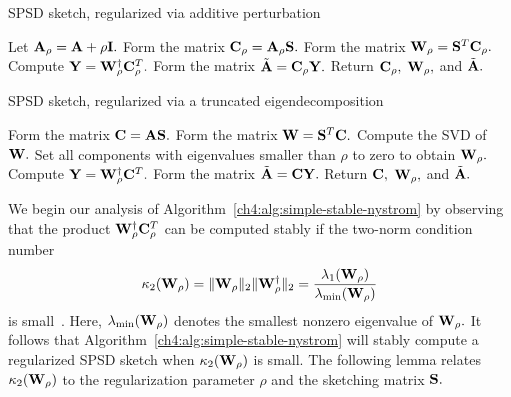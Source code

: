 \begin{algorithm}[t]
 \caption{SPSD sketch, regularized via additive perturbation~\cite{WS01}}
 \label{ch4:alg:simple-stable-nystrom}
 \algrenewcommand{}
 \algrenewcommand{}
 \begin{algorithmic}[1]
  \Statex
  
 \State Let $\mathbf{A}_\rho = \mathbf{A} + \rho \mathbf{I}.$
 \State Form the matrix $\mathbf{C}_\rho = \mathbf{A}_\rho \mathbf{S}.$
 \State Form the matrix $\mathbf{W}_\rho = \mathbf{S}^T \mathbf{C}_\rho.$
 \State Compute $\mathbf{Y} = \mathbf{W}_\rho^\dagger \mathbf{C}_\rho ^T.$
 \State Form the matrix $\tilde{\mathbf{A}} = \mathbf{C}_\rho \mathbf{Y}.$
 \State Return $\mathbf{C}_\rho,$ $\mathbf{W}_\rho,$ and $\tilde{\mathbf{A}}.$
  \end{algorithmic}
\end{algorithm}

\begin{algorithm}
 \caption{SPSD sketch, regularized via a truncated eigendecomposition~\cite[Algorithm 1]{CD11}}
 \label{ch4:alg:CD11}
 \algrenewcommand{}
 \algrenewcommand{}
 \begin{algorithmic}[1]
  \Statex

 \State Form the matrix $\mathbf{C} = \mathbf{A} \mathbf{S}.$
 \State Form the matrix $\mathbf{W} = \mathbf{S}^T \mathbf{C}.$
 \State Compute the SVD of $\mathbf{W}.$ Set all components with eigenvalues smaller than $\rho$ to zero to obtain
 $\mathbf{W}_\rho.$
 \State Compute $\mathbf{Y} = \mathbf{W}_\rho^\dagger \mathbf{C}^T.$
 \State Form the matrix $\tilde{\mathbf{A}} = \mathbf{C} \mathbf{Y}.$
 \State Return $\mathbf{C},$ $\mathbf{W}_\rho,$ and $\tilde{\mathbf{A}}.$
 \end{algorithmic}
\end{algorithm}

We begin our analysis of Algorithm~\ref{ch4:alg:simple-stable-nystrom} by observing that 
the product $\mathbf{W}_\rho^\dagger \mathbf{C}_\rho^T$ can be
computed stably if the two-norm condition number 
\[
 \kappa_2(\mathbf{W}_\rho) = \|\mathbf{W}_\rho\|_2 \|\mathbf{W}_\rho^\dagger\|_2 = \frac{\lambda_1(\mathbf{W}_\rho)}{\lambda_\text{min}(\mathbf{W}_\rho)}
\]
is small~\cite{GL96}. Here, $\lambda_\text{min}(\mathbf{W}_\rho)$ denotes the smallest nonzero eigenvalue of $\mathbf{W}_\rho.$ 
It follows that Algorithm~\ref{ch4:alg:simple-stable-nystrom}
will stably compute a regularized SPSD sketch when $\kappa_2(\mathbf{W}_\rho)$ is small. The following
lemma relates $\kappa_2(\mathbf{W}_\rho)$ to the regularization parameter $\rho$ and the
sketching matrix $\mathbf{S}.$

